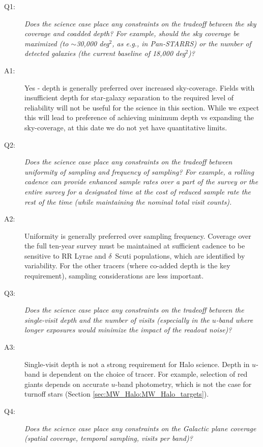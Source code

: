  \begin{description}

 \item[Q1:] {\it Does the science case place any constraints on the
 tradeoff between the sky coverage and coadded depth? For example, should
 the sky coverage be maximized (to $\sim$30,000 deg$^2$, as e.g., in
 Pan-STARRS) or the number of detected galaxies (the current baseline 
 of 18,000 deg$^2$)?}

\item[A1:] Yes - depth is generally preferred over increased
  sky-coverage. Fields with insufficient depth for star-galaxy
  separation to the required level of reliability will not be useful
  for the science in this section. While we expect this will lead to
  preference of achieving minimum depth vs expanding the sky-coverage,
  at this date we do not yet have quantitative limits.

 \item[Q2:] {\it Does the science case place any constraints on the
 tradeoff between uniformity of sampling and frequency of  sampling? For
 example, a rolling cadence can provide enhanced sample rates over a part
 of the survey or the entire survey for a designated time at the cost of
 reduced sample rate the rest of the time (while maintaining the nominal
 total visit counts).}

\item[A2:] Uniformity is generally preferred over sampling frequency. Coverage over the full ten-year survey must be maintained at sufficient cadence to be sensitive to RR Lyrae and $\delta$~Scuti populations, which are identified by variability. For the other tracers (where co-added depth is the key requirement), sampling considerations are less important.

 \item[Q3:] {\it Does the science case place any constraints on the
 tradeoff between the single-visit depth and the number of visits
 (especially in the $u$-band where longer exposures would minimize the
 impact of the readout noise)?}

\item[A3:] Single-visit depth is not a strong requirement for Halo science. Depth in $u$-band is dependent on the choice of tracer. For example, selection of red giants depends on accurate $u$-band photometry, which is not the case for turnoff stars (Section \ref{sec:MW_Halo:MW_Halo_targets}).

 \item[Q4:] {\it Does the science case place any constraints on the
 Galactic plane coverage (spatial coverage, temporal sampling, visits per
 band)?}


\end{description}
